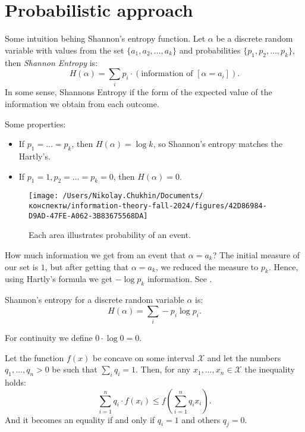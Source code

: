 
\section{Probabilistic approach}

Some intuition behing Shannon's entropy function.
Let $\alpha$ be a discrete random variable with values from the set $\{a_1, a_2, \ldots, a_k\}$ and probabilities $\{p_1, p_2, \ldots, p_k\}$, then \emph{Shannon Entropy} is:
\[
    H(\alpha) = \sum_i p_i \cdot (\text{information of } [\alpha = a_i]).
\]
In some sense, Shannons Entropy if the form of the expected value of the information we obtain from each outcome.

Some properties:
\begin{itemize}
    \item If $p_1 = \dots = p_k$, then $H(\alpha) = \log k$, so Shannon's entropy matches the Hartly's.
    \item If $p_1 = 1, p_2 = \dots = p_k = 0$, then $H(\alpha) = 0$.
\end{itemize}

\begin{figure}[H]
    \centering
    \texttt{[image: /Users/Nikolay.Chukhin/Documents/конспекты/information-theory-fall-2024/figures/42D86984-D9AD-47FE-A062-3B83675568DA]}
    \caption{Each area illustrates probability of an event.}
    \label{fig:42d86984-d9ad-47fe-a062-3b83675568da}
\end{figure}

How much information we get from an event that $\alpha = a_k$?
The initial measure of our set is $1$, but after getting that $\alpha = a_k$, we reduced the measure to $p_k$.
Hence, using Hartly's formula we get $-\log p_k$ information.
See .

\begin{definition}[1948]
    Shannon's entropy for a discrete random variable $\alpha$ is:
    \[
        H(\alpha) = \sum_i - p_i \log p_i.
    \]
\end{definition}
For continuity we define $0 \cdot \log 0 = 0$.

\begin{theorem}
    \label{thm:jensen}
    Let the function $f(x)$ be concave on some interval $\mathcal X$ and let the numbers $q_1, \ldots, q_n > 0$ be such that $\sum_i q_i = 1$.
    Then, for any $x_1, \ldots, x_n \in \mathcal X$ the inequality holds:
    \[
        \sum_{i = 1}^n q_i \cdot f(x_i) \leq f\left(\sum_{i = 1}^n q_i x_i\right).
    \]
    And it becomes an equality if and only if $q_i = 1$ and others $q_j = 0$.
\end{theorem}

